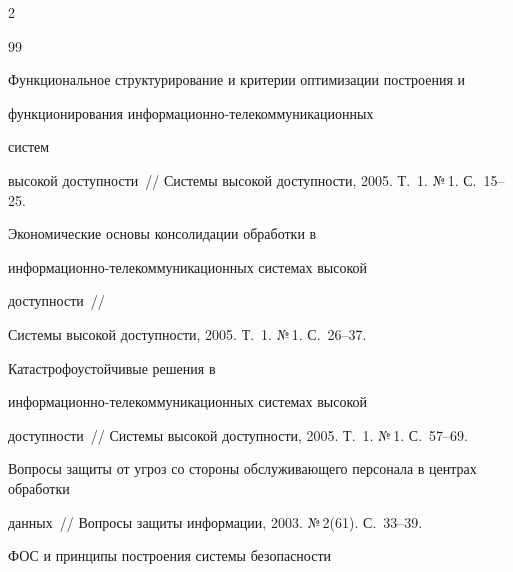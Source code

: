 \begin{multicols}{2}
{{\begin{thebibliography}{99}




Функциональное структурирование и критерии оптимизации построения и 


функциони\-ро\-вания ин\-фор\-ма\-ци\-он\-но-те\-ле\-ком\-му\-ни\-ка\-ци\-он\-ных\linebreak


 сис\-тем 


высокой доступности~// Системы высокой доступности, 2005. Т.~1. №\,1. С.~15--25.









Экономические основы консолидации обработки в 


ин\-фор\-ма\-ци\-он\-но-те\-ле\-ком\-му\-ни\-ка\-ци\-он\-ных сис\-те\-мах высокой 


доступности~//\linebreak


Системы высокой доступности, 2005. Т.~1. №\,1. С.~26--37.









Катастрофоустойчивые решения в 


ин\-фор\-ма\-ци\-он\-но-те\-ле\-ком\-му\-ни\-ка\-ци\-он\-ных сис\-те\-мах высокой 


доступности~// Сис\-те\-мы высокой доступности, 2005. Т.~1. №\,1. С.~57--69.









Вопросы защиты от угроз со стороны обслуживающего персонала в центрах обработки 


данных~// Вопросы защиты информации, 2003. №\,2(61). С.~33--39.









ФОС и принципы построения сис\-те\-мы безопасности 



\end{thebibliography}}}
\end{multicols}
